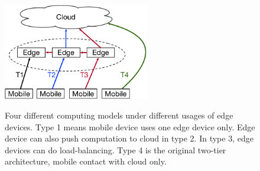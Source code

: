{
\begin{figure}[th]
\begin{center}
	\centerline{\includegraphics[width=2.5in]{Figures/computing-models.pdf}}
	{
		Four different computing models under different usages of edge devices.
		Type 1 means mobile device uses one edge device only. Edge device
		can also push computation to cloud in type 2. In type 3, edge devices
		can do load-balancing. Type 4 is the original two-tier architecture,
		mobile contact with cloud only.
	}
\end{center}
\end{figure}
}
